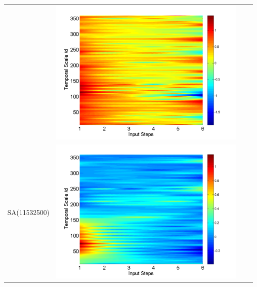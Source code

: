 \documentclass[draft,wrr]{AGUTeX}
\begin{document}
\begin{article}
\begin{table}[H]
\begin{tabular}{cccc}
&\begin{minipage}{.3\textwidth}\includegraphics[width=\linewidth]{resultgraph/05585000qdiff_former.png}\end{minipage}
\\
SA(11532500)
&\begin{minipage}{.3\textwidth}\includegraphics[width=\linewidth]{resultgraph/11532500pdiff_former.png}\end{minipage}

\end{tabular}
\end{table}
\end{article}
\end{document}
